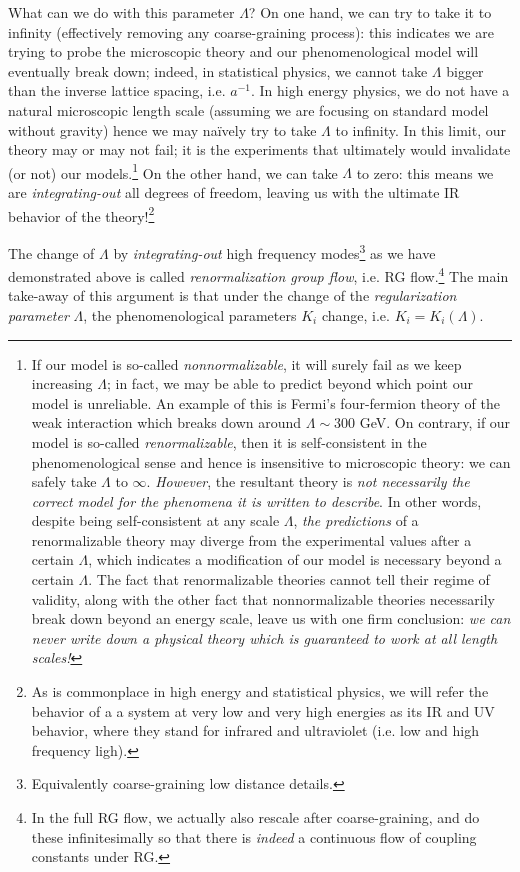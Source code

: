 \documentclass[12pt]{article}
\numberwithin{equation}{section}
\def\naively{naïvely }
\begin{document}
What can we do with this parameter $\Lambda$? On one hand, we can try to take it to infinity (effectively removing any coarse-graining process): this indicates we are trying to probe the microscopic theory and our phenomenological model will eventually break down; indeed, in statistical physics, we cannot take $\Lambda$ bigger than the inverse lattice spacing, i.e. $a^{-1}$. In high energy physics, we do not have a natural microscopic length scale (assuming we are focusing on standard model without gravity) hence we may \naively try to take $\Lambda$ to infinity. In this limit, our theory may or may not fail; it is the experiments that ultimately would invalidate (or not) our models.\footnote{\label{footnote: normalizable vs nonnormalizable}
If our model is so-called \emph{nonnormalizable}, it will surely fail as we keep increasing $\Lambda$; in fact, we may be able to predict beyond which point our model is unreliable. An example of this is Fermi's  four-fermion theory of the weak interaction which breaks down around $\Lambda\sim 300$ GeV. On contrary, if our model is so-called \emph{renormalizable}, then it is self-consistent in the phenomenological sense and hence is insensitive to microscopic theory: we can safely take $\Lambda$ to $\infty$. \emph{However}, the resultant theory is \emph{not necessarily the correct model for the phenomena it is written to describe}. In other words, despite being self-consistent at any scale $\Lambda$, \emph{the predictions} of a renormalizable theory may diverge from the experimental values after a certain $\Lambda$, which indicates a modification of our model is necessary beyond a certain $\Lambda$. The fact that renormalizable theories cannot tell their regime of validity, along with the other fact that nonnormalizable theories necessarily break down beyond an energy scale, leave us with one firm conclusion: \emph{we can never write down a physical theory which is guaranteed to work at all length scales!}
} On the other hand, we can take $\Lambda$ to zero: this means we are \emph{integrating-out} all degrees of freedom, leaving us with the ultimate IR behavior of the theory!\footnote{
As is commonplace in high energy and statistical physics, we will refer the behavior of a a system at very low and very high energies as its IR and UV behavior, where they stand for infrared and ultraviolet (i.e. low and high frequency ligh).
}

The change of $\Lambda$ by \emph{integrating-out} high frequency modes\footnote{Equivalently coarse-graining low distance details.} as we have demonstrated above is called \emph{renormalization group flow}, i.e. RG flow.\footnote{In the full RG flow, we actually also rescale after coarse-graining, and do these infinitesimally so that there is \emph{indeed} a continuous flow of coupling constants under RG.} The main take-away of this argument is that under the change of the \emph{regularization parameter} $\Lambda$, the phenomenological parameters $K_i$ change, i.e. $K_i=K_i(\Lambda)$.
\end{document}
